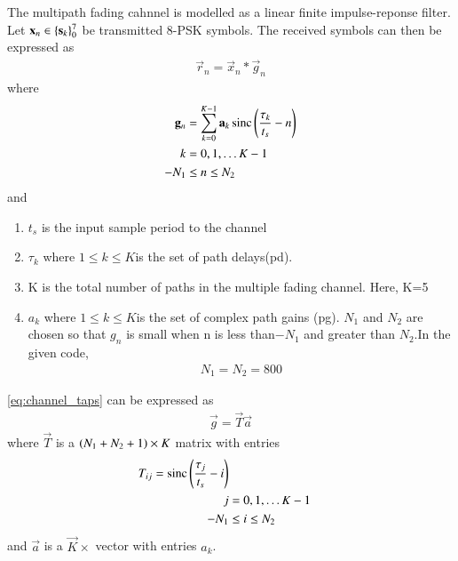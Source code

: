 The multipath fading cahnnel is modelled as a linear finite impulse-reponse filter.
Let $\mathbf{x}_n \in \left\{\mathbf{s}_k\right\}_{0}^{7}$ be transmitted 8-PSK symbols.  The received symbols can then be expressed as
\begin{align}
\vec{r}_n = \vec{x}_n * \vec{g}_n
\end{align}
where
\begin{align}
\label{eq:channel_taps}
\mathbf{g}_n &= 
\sum_{k=0}^{K-1}\mathbf{a}_k \operatorname*{sinc}{\left(\frac{\tau_k}{t_s}-n\right)}
\\
k &= 0, 1, \dots K-1
\\
-N_1 &\leq n \leq N_2
\end{align}
and
\begin{enumerate}
\item $t_s$ is the input sample period to the channel
\item $\tau_k$ where $1\leq k \leq K$is the set of path delays(pd).
\item K is the total number of paths in the multiple fading channel. Here, K=5 
\item $a_k$ where $1\leq k \leq K$is the set of complex path gains (pg).
$N_1$ and $N_2$ are chosen so that $g_n$ is small when n is less than$-N_1$ and greater than $N_2$.In the given code,
\begin{align}
N_1=N_2=800
\end{align}
\end{enumerate}
\eqref{eq:channel_taps} can be expressed as
\begin{align}
\label{eq:channel_taps_mat}
\vec{g}=
\vec{T}\vec{a}
\end{align}
where $\vec{T}$ is a $\left(N_1+N_2+1\right)\times K$ matrix with entries
\begin{align}
T_{ij} = \operatorname*{sinc}{\left(\frac{\tau_j}{t_s}-i\right)}
\\
j &= 0, 1, \dots K-1
\\
-N_1 &\leq i \leq N_2
\end{align}
and $\vec{a}$ is a $\vec{K}\times$ vector with entries $a_k$.
